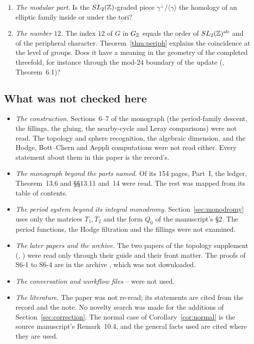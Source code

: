 \begin{enumerate}[label=\arabic*.,ref=\arabic*]
\item\label{q:elliptic} \emph{The modular part.} Is the $SL_2(\mathbb{Z})$-graded piece $\gamma^\perp/\langle\gamma\rangle$ the homology of an elliptic family inside or under the tori?
\item\label{q:index12} \emph{The number $12$.} The index $12$ of $G$ in $G_{\mathbb{Z}}$ equals the order of $SL_2(\mathbb{Z})^{\mathrm{ab}}$ and of the peripheral character. Theorem~\ref{thm:periph} explains the coincidence at the level of groups. Does it have a meaning in the geometry of the completed threefold, for instance through the mod-$24$ boundary of the update (, Theorem~6.1)?
\end{enumerate}

\subsection{What was not checked here}

\begin{itemize}
\item \emph{The construction.} Sections~6--7 of the monograph (the period-family descent, the fillings, the gluing, the nearby-cycle and Leray comparisons) were not read. The topology and sphere recognition, the algebraic dimension, and the Hodge, Bott--Chern and Aeppli computations were not read either. Every statement about them in this paper is the record's.
\item \emph{The monograph beyond the parts named.} Of its 154 pages, Part~I, the ledger, Theorem~13.6 and §§13.11 and~14 were read. The rest was mapped from its table of contents.
\item \emph{The period system beyond its integral monodromy.} Section~\ref{sec:monodromy} uses only the matrices $T_1,T_2$ and the form $Q_0$ of the manuscript's §2. The period functions, the Hodge filtration and the fillings were not examined.
\item \emph{The later papers and the archive.} The two papers of the topology supplement (, ) were read only through their guide and their front matter. The proofs of S6-1 to S6-4 are in the archive , which was not downloaded.
\item \emph{The conversation and workflow files} -- were not used.
\item \emph{The literature.} The paper \cite{CDP20} was not re-read; its statements are cited from the record and the note. No novelty search was made for the additions of Section~\ref{sec:correction}. The normal case of Corollary~\ref{cor:normal} is the source manuscript's Remark~10.4, and the general facts used are cited where they are used.
\end{itemize}

